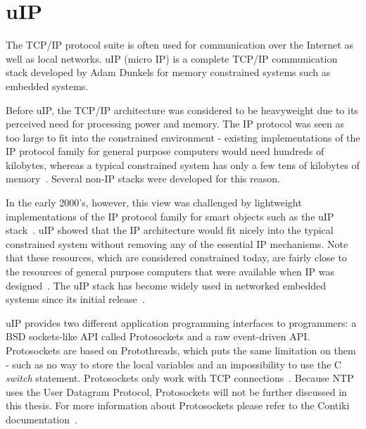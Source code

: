 
\section{uIP}\label{sec:contiki-uip}
The TCP/IP protocol suite is often used for communication over the Internet as well as local networks.
uIP (micro IP) is a complete TCP/IP communication stack developed by Adam Dunkels
for memory constrained systems such as embedded systems.

Before uIP, the TCP/IP architecture was considered to be heavyweight
due to its perceived need for processing power and memory.
The IP protocol was seen as too large to fit into the constrained environment -
existing implementations of the IP protocol family for general purpose computers would need hundreds
of kilobytes, whereas a typical constrained system has only a few tens of kilobytes of memory~\cite{interconnecting}. %
Several non-IP stacks were developed for this reason.

In the early 2000's, however, this view was challenged by lightweight implementations of the IP
protocol family for smart objects such as the uIP stack~\cite{interconnecting}.
uIP showed that the IP architecture would fit nicely into the typical constrained system
without removing any of the essential IP mechanisms.
Note that these resources, which are considered constrained today, are fairly close to the
resources of general purpose computers that were available when IP was designed~\cite{interconnecting}.
The uIP stack has become widely used in networked embedded systems
since its initial release~\cite{interconnecting, thesis-programming}.

uIP provides two different application programming interfaces to programmers:
a BSD sockets-like API called Protosockets and a raw event-driven API.
Protosockets are based on Protothreads, which puts the same limitation on them - such as %
no way to store the local variables and an impossibility to use the C {\it switch} statement.
Protosockets only work with TCP connections~\cite{contiki-docs}.
Because NTP uses the User Datagram Protocol, Protosockets will not be further
discussed in this thesis. For more information about Protosockets
please refer to the Contiki documentation~\cite{contiki-docs}.

